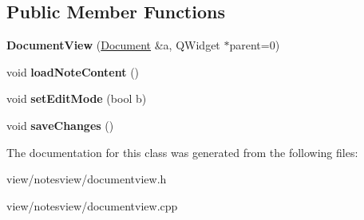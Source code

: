 \subsection*{Public Member Functions}
\begin{DoxyCompactItemize}
\item 
\hypertarget{class_document_view_ae7344463a3a7155afae129a3a851083c}{{\bfseries Document\-View} (\hyperlink{class_document}{Document} \&a, Q\-Widget $\ast$parent=0)}\label{class_document_view_ae7344463a3a7155afae129a3a851083c}

\item 
\hypertarget{class_document_view_a15728c49b4550846883ba922a2ee7e12}{void {\bfseries load\-Note\-Content} ()}\label{class_document_view_a15728c49b4550846883ba922a2ee7e12}

\item 
\hypertarget{class_document_view_a734853f477ab8e76d4a9605f68a5fee4}{void {\bfseries set\-Edit\-Mode} (bool b)}\label{class_document_view_a734853f477ab8e76d4a9605f68a5fee4}

\item 
\hypertarget{class_document_view_a8b3274bcbd61dd967c6fa16fdb2eca62}{void {\bfseries save\-Changes} ()}\label{class_document_view_a8b3274bcbd61dd967c6fa16fdb2eca62}

\end{DoxyCompactItemize}


The documentation for this class was generated from the following files\-:\begin{DoxyCompactItemize}
\item 
view/notesview/documentview.\-h\item 
view/notesview/documentview.\-cpp\end{DoxyCompactItemize}
